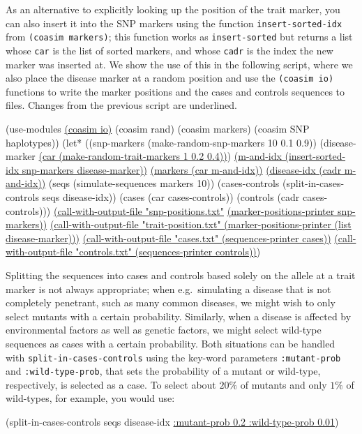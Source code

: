 \documentclass{manual}
\begin{document}
As an alternative to explicitly looking up the position of the trait
marker, you can also insert it into the SNP markers using the function
\texttt{insert-sorted-idx} from \texttt{(coasim markers)}; this
function works as \texttt{insert-sorted} but returns a list whose
\texttt{car} is the list of sorted markers, and whose \texttt{cadr} is
the index the new marker was inserted at.  We show the use of this in
the following script, where we also place the disease marker at a
random position and use the \texttt{(coasim io)} functions to write
the marker positions and the cases and controls sequences to files.
Changes from the previous script are underlined.
\begin{code}
(use-modules \underline{(coasim io)} (coasim rand)
             (coasim markers) (coasim SNP haplotypes))
(let* ((snp-markers    (make-random-snp-markers   10 0.1 0.9))
       (disease-marker \underline{(car (make-random-trait-markers 1 0.2 0.4))})
       \underline{(m-and-idx (insert-sorted-idx snp-markers disease-marker))}
       \underline{(markers (car m-and-idx))}
       \underline{(disease-idx (cadr m-and-idx))}
       (seqs (simulate-sequences markers 10))
       (cases-controls (split-in-cases-controls seqs disease-idx))
       (cases (car cases-controls))
       (controls (cadr cases-controls)))
  \underline{(call-with-output-file "snp-positions.txt"}
  \underline{  (marker-positions-printer snp-markers))}
  \underline{(call-with-output-file "trait-position.txt" }
  \underline{  (marker-positions-printer (list disease-marker)))}
  \underline{(call-with-output-file "cases.txt"    (sequences-printer cases))}
  \underline{(call-with-output-file "controls.txt" (sequences-printer controls))})
\end{code}

Splitting the sequences into cases and controls based solely on the
allele at a trait marker is not always appropriate; when e.g.\ 
simulating a disease that is not completely penetrant, such as many
common diseases, we might wish to only select mutants with a certain
probability.  Similarly, when a disease is affected by environmental
factors as well as genetic factors, we might select wild-type
sequences as cases with a certain probability.  Both situations can be
handled with \texttt{split-in-cases-controls} using the key-word
parameters \texttt{:mutant-prob} and \texttt{:wild-type-prob}, that
sets the probability of a mutant or wild-type, respectively, is
selected as a case.  To select about $20\%$ of mutants and only
$1\%$ of wild-types, for example, you would use:
\begin{code}
(split-in-cases-controls seqs disease-idx
                         \underline{:mutant-prob 0.2 :wild-type-prob 0.01})
\end{code}
\end{document}
